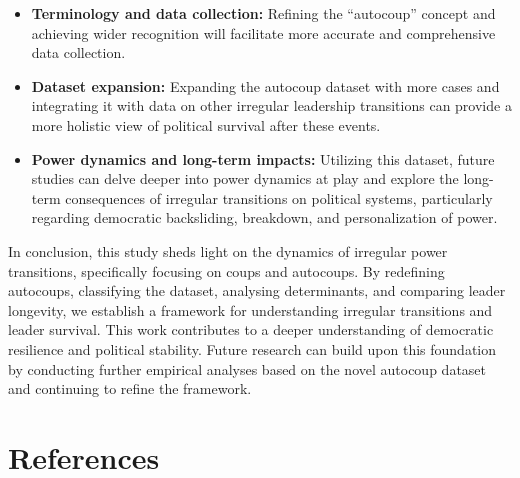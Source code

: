 \documentclass[
  12pt,
]{report}
\begin{document}
\begin{itemize}
\item
  \textbf{Terminology and data collection:} Refining the ``autocoup''
  concept and achieving wider recognition will facilitate more accurate
  and comprehensive data collection.
\item
  \textbf{Dataset expansion:} Expanding the autocoup dataset with more
  cases and integrating it with data on other irregular leadership
  transitions can provide a more holistic view of political survival
  after these events.
\item
  \textbf{Power dynamics and long-term impacts:} Utilizing this dataset,
  future studies can delve deeper into power dynamics at play and
  explore the long-term consequences of irregular transitions on
  political systems, particularly regarding democratic backsliding,
  breakdown, and personalization of power.
\end{itemize}

In conclusion, this study sheds light on the dynamics of irregular power
transitions, specifically focusing on coups and autocoups. By redefining
autocoups, classifying the dataset, analysing determinants, and
comparing leader longevity, we establish a framework for understanding
irregular transitions and leader survival. This work contributes to a
deeper understanding of democratic resilience and political stability.
Future research can build upon this foundation by conducting further
empirical analyses based on the novel autocoup dataset and continuing to
refine the framework.

\newpage

\chapter*{References}\label{references}
\end{document}

